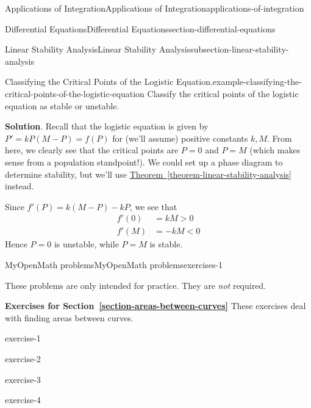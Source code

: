 \documentclass[oneside,10pt,]{book}
\numberwithin{equation}{section}
\newcommand{\lt}{<}
\newcommand{\gt}{>}
\begin{document}
\begin{chapterptx}{Applications of Integration}{}{Applications of Integration}{}{}{applications-of-integration}
\begin{sectionptx}{Differential Equations}{}{Differential Equations}{}{}{section-differential-equations}
\begin{subsectionptx}{Linear Stability Analysis}{}{Linear Stability Analysis}{}{}{subsection-linear-stability-analysis}
\begin{example}{Classifying the Critical Points of the Logistic Equation.}{example-classifying-the-critical-points-of-the-logistic-equation}
\hypertarget{p-772}{}%
Classify the critical points of the logistic equation as stable or unstable.%
\par\smallskip%
\noindent\textbf{Solution}.\hypertarget{solution-161}{}\quad%
\hypertarget{p-773}{}%
Recall that the logistic equation is given by \(P' = kP(M-P) = f(P)\) for (we'll assume) positive constants \(k,M\). From here, we clearly see that the critical points are \(P = 0\) and \(P = M\) (which makes sense from a population standpoint!). We could set up a phase diagram to determine stability, but we'll use \hyperref[theorem-linear-stability-analysis]{Theorem~\ref{theorem-linear-stability-analysis}} instead.%
\par
\hypertarget{p-774}{}%
Since \(f'(P) = k(M-P) - kP\), we see that%
\begin{align*}
f'(0) & = kM \gt 0\\
f'(M) & = -kM \lt 0 
\end{align*}
Hence \(P = 0\) is unstable, while \(P = M\) is stable.%
\end{example}
\end{subsectionptx}
\end{sectionptx}
%
%
\typeout{************************************************}
\typeout{************************************************}
%
\begin{exercises-section}{MyOpenMath problems}{}{MyOpenMath problems}{}{}{exercises-1}
\begin{introduction}{}%
\hypertarget{p-775}{}%
These problems are only intended for practice. They are \emph{not} required.%
\end{introduction}%
\par\medskip\noindent%
\textbf{Exercises for Section~\ref*{section-areas-between-curves}}\space\space\hypertarget{exercisegroup-1}{}%
\hypertarget{p-776}{}%
These exercises deal with finding areas between curves.%
\begin{exercisegroup}
\begin{divisionexerciseeg}{1}{}{}{exercise-1}%
\end{divisionexerciseeg}%
\begin{divisionexerciseeg}{2}{}{}{exercise-2}%
\end{divisionexerciseeg}%
\begin{divisionexerciseeg}{3}{}{}{exercise-3}%
\end{divisionexerciseeg}%
\begin{divisionexerciseeg}{4}{}{}{exercise-4}%
\end{divisionexerciseeg}%

\end{exercisegroup}
\end{exercises-section}
\end{chapterptx}
\end{document}
